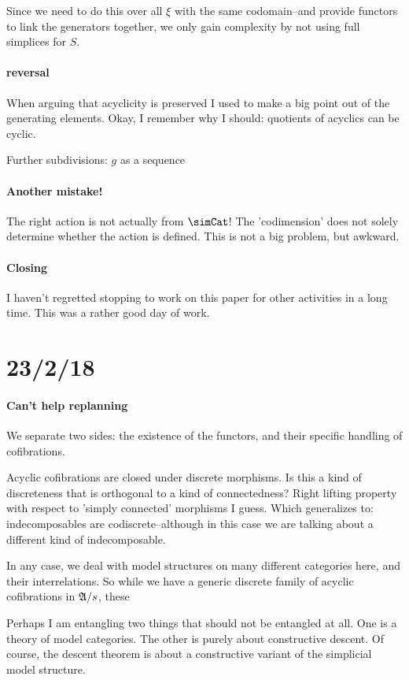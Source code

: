 \documentclass[csh.tex]{subfiles}
\begin{document}
Since we need to do this over all $\xi$ with the same codomain--and provide functors to link the generators together, we only gain complexity by not using full simplices for $S$.

\paragraph{reversal}
When arguing that acyclicity is preserved I used to make a big point out of the generating elements. Okay, I remember why I should: quotients of acyclics can be cyclic.

Further subdivisions: $g$ as a sequence 

\paragraph{Another mistake!}
The right action is not actually from $\simCat$! The 'codimension' does not solely determine whether the action is defined. This is not a big problem, but awkward.

\paragraph{Closing}
I haven't regretted stopping to work on this paper for other activities in a long time. This was a rather good day of work.

\section{23/2/18}
\paragraph{Can't help replanning}
We separate two sides: the existence of the functors, and their specific handling of cofibrations.

Acyclic cofibrations are closed under discrete morphisms. Is this a kind of discreteness that is orthogonal to a kind of connectedness?
Right lifting property with respect to 'simply connected' morphisms I guess. Which generalizes to: indecomposables are codiscrete--although in this case we are talking about a different kind of indecomposable.

In any case, we deal with model structures on many different categories here, and their interrelations. So while we have a generic discrete family of acyclic cofibrations in $\mathfrak A/s$, these 


Perhaps I am entangling two things that should not be entangled at all. One is a theory of model categories. The other is purely about constructive descent.
Of course, the descent theorem is about a constructive variant of the simplicial model structure. 
\end{document}
